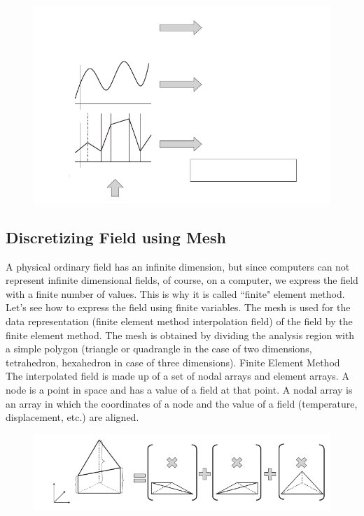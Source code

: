 \begin{figure}[htbp!]
\center
\includegraphics[width=120mm]{images/fem_variational_overview.pdf}
\end{figure}




\subsection{Discretizing Field using Mesh}
A physical ordinary field has an infinite dimension, but since computers can not represent infinite dimensional fields, of course, on a computer, we express the field with a finite number of values. This is why it is called ``finite" element method. 
%
Let's see how to express the field using finite variables.
%
The mesh is used for the data representation (finite element method interpolation field) of the field by the finite element method. 
%
The mesh is obtained by dividing the analysis region with a simple polygon (triangle or quadrangle in the case of two dimensions, tetrahedron, hexahedron in case of three dimensions). 
%
Finite Element Method The interpolated field is made up of a set of nodal arrays and element arrays.
%
A node is a point in space and has a value of a field at that point. 
%
A nodal array is an array in which the coordinates of a node and the value of a field (temperature, displacement, etc.) are aligned.


\begin{figure}[htbp!]
\center
\includegraphics[width=120mm]{images/triangle_interp.pdf}
\label{fig:triangle_interp}
\end{figure}


